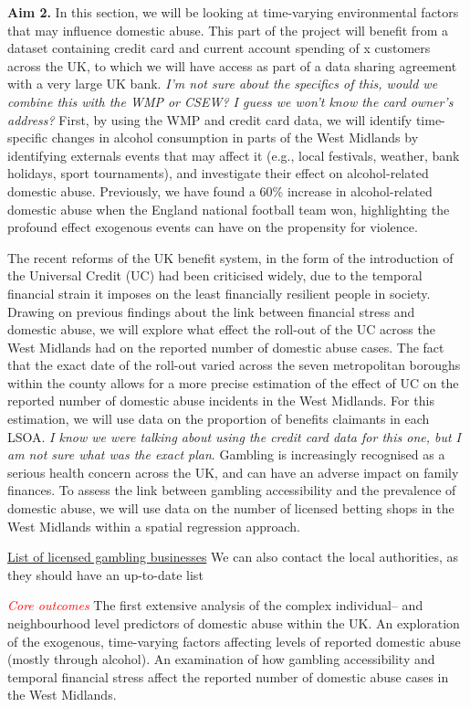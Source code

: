 \documentclass[11pt, a4paper]{article}
\begin{document}
\textbf{Aim 2.} In this section, we will be looking at time-varying environmental factors that may influence domestic abuse. This part of the project will benefit from a dataset containing credit card and current account spending of x customers across the UK, to which we will have access as part of a data sharing agreement with a very large UK bank. \textit{I'm not sure about the specifics of this, would we combine this with the WMP or CSEW? I guess we won't know the card owner's address?} First, by using the WMP and credit card data, we will identify time-specific changes in alcohol consumption in parts of the West Midlands by identifying externals events that may affect it (e.g., local festivals, weather, bank holidays, sport tournaments), and investigate their effect on alcohol-related domestic abuse. Previously, we have found a 60\% increase in alcohol-related domestic abuse when the England national football team won, highlighting the profound effect exogenous events can have on the propensity for violence. 


  The recent reforms of the UK benefit system, in the form of the introduction of the Universal Credit (UC) had been criticised widely, due to the temporal financial strain it imposes on the least financially resilient people in society. Drawing on previous findings about the link between financial stress and domestic abuse, we will explore what effect the roll-out of the UC across the West Midlands had on the reported number of domestic abuse cases. The fact that the exact date of the roll-out varied across the seven metropolitan boroughs within the county allows for a more precise estimation of the effect of UC on the reported number of domestic abuse incidents in the West Midlands. For this estimation, we will use data on the proportion of benefits claimants in each LSOA. \textit{I know we were talking about using the credit card data for this one, but I am not sure what was the exact plan}. Gambling is increasingly recognised as a serious health concern across the UK, and can have an adverse impact on family finances. To assess the link between gambling accessibility and the prevalence of domestic abuse, we will use data on the number of licensed betting shops in the West Midlands within a spatial regression approach.

\href{https://secure.gamblingcommission.gov.uk/PublicRegister}{List of licensed gambling businesses} We can also contact the local authorities, as they should have an up-to-date list


\textcolor{red}{\textit{Core outcomes}} The first extensive analysis of the complex individual-- and neighbourhood level predictors of domestic abuse within the UK. An exploration of the exogenous, time-varying factors affecting levels of reported domestic abuse (mostly through alcohol). An examination of how gambling accessibility and temporal financial stress affect the reported number of domestic abuse cases in the West Midlands. 
\end{document}
